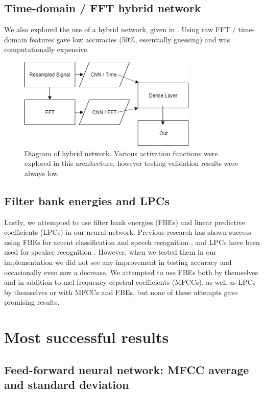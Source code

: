 \documentclass{article}
\begin{document}
\subsection{Time-domain / FFT hybrid network}
\label{subsec:fft}

We also explored the use of a hybrid network, given in .
Using raw FFT / time-domain features gave low accuracies (50\%, essentially guessing) and was computationally expensive.

\begin{figure}[htb]
	\centering
	\includegraphics[width = 8.5cm]{figs/hybrid_network}
	\caption{Diagram of hybrid network.
	Various activation functions were explored in this architecture, however testing validation results were always low.}
	\label{fig:hybrid}
\end{figure}

\subsection{Filter bank energies and LPCs}
\label{subsec:fbe}

Lastly, we attempted to use filter bank energies (FBEs) and linear predictive coefficients (LPCs) in our neural network.
Previous research has shown success using FBEs for accent classification and speech recognition \cite{Paliwal, chuaccent}, and LPCs have been used for speaker recognition \cite{lpc}.
However, when we tested them in our implementation we did not see any improvement in testing accuracy and occasionally even saw a decrease.
We attempted to use FBEs both by themselves and in addition to mel-frequency cepstral coefficients (MFCCs), as well as LPCs by themselves or with MFCCs and FBEs, but none of these attempts gave promising results.

\section{Most successful results}
\label{sec:success}

\subsection{Feed-forward neural network: MFCC average and standard deviation}
\label{subsec:feedforward}
\end{document}
